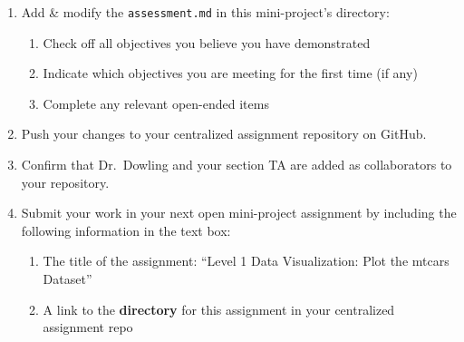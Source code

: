 \documentclass[
  man,
  floatsintext,
  longtable,
  nolmodern,
  notxfonts,
  notimes,
  colorlinks=true,linkcolor=blue,citecolor=blue,urlcolor=blue]{apa7}
\providecommand{\tightlist}{%
  \setlength{\itemsep}{0pt}\setlength{\parskip}{0pt}}
\begin{document}
\begin{enumerate}
\def\labelenumi{\arabic{enumi}.}
\tightlist
\item
  Add \& modify the \texttt{assessment.md} in this mini-project's
  directory:

  \begin{enumerate}
  \def\labelenumii{\arabic{enumii}.}
  \tightlist
  \item
    Check off all objectives you believe you have demonstrated
  \item
    Indicate which objectives you are meeting for the first time (if
    any)
  \item
    Complete any relevant open-ended items
  \end{enumerate}
\item
  Push your changes to your centralized assignment repository on GitHub.
\item
  Confirm that Dr.~Dowling and your section TA are added as
  collaborators to your repository.
\item
  Submit your work in your next open mini-project assignment by
  including the following information in the text box:

  \begin{enumerate}
  \def\labelenumii{\arabic{enumii}.}
  \tightlist
  \item
    The title of the assignment: ``Level 1 Data Visualization: Plot the
    mtcars Dataset''
  \item
    A link to the \textbf{directory} for this assignment in your
    centralized assignment repo
  \end{enumerate}
\end{enumerate}
\end{document}
